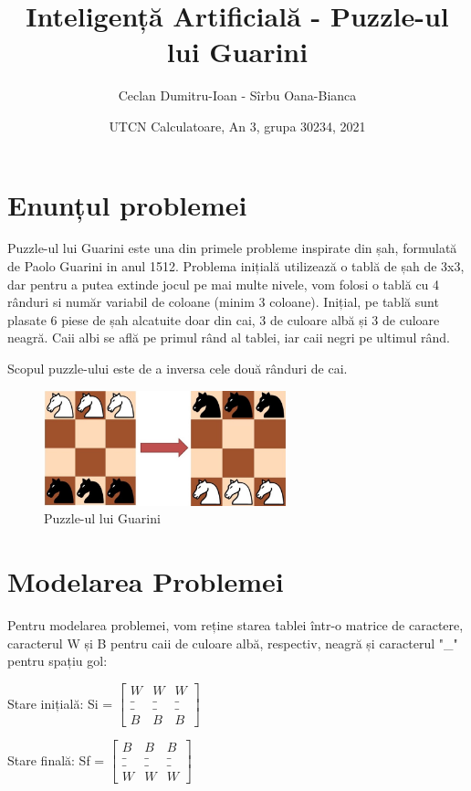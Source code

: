 \documentclass{article}
\title{Inteligență Artificială - Puzzle-ul lui Guarini}
\author{Ceclan Dumitru-Ioan - Sîrbu Oana-Bianca}
\date{UTCN Calculatoare, An 3, grupa 30234, 2021}
\begin{document}
\maketitle

\section{Enunțul problemei}
   
    Puzzle-ul lui Guarini este una din primele probleme inspirate din șah, formulată de Paolo Guarini in anul 1512. Problema inițială utilizează o tablă de șah de 3x3, dar pentru a putea extinde jocul pe mai multe nivele, vom folosi o tablă cu 4 rânduri si număr variabil de coloane (minim 3 coloane). 
    Inițial, pe tablă sunt plasate 6 piese de șah alcatuite doar din cai, 3 de culoare albă și 3 de culoare neagră. Caii albi se află pe primul rând al tablei, iar caii negri pe ultimul rând. 
    
    Scopul puzzle-ului este de a inversa cele două rânduri de cai.
    \begin{figure}[h!]
    \centering
    \includegraphics[width=70mm]{guarini}
    \caption{Puzzle-ul lui Guarini}
    \label{fig:method}
    \end{figure}
    
\section{Modelarea Problemei}
    Pentru modelarea problemei, vom reține starea tablei într-o matrice de caractere, caracterul W și B pentru caii de culoare albă, respectiv, neagră și caracterul "\_" pentru spațiu gol:
    
    Stare inițială: Si = 
    $\begin{bmatrix} 
    W & W & W\\
    \_ & \_ & \_\\
    \_ & \_ & \_\\
    B & B & B
    \end{bmatrix}$
    
    Stare finală: Sf = 
    $\begin{bmatrix} 
    B & B & B\\
    \_ & \_ & \_\\
    \_ & \_ & \_\\
    W & W & W
    \end{bmatrix}$
    
\end{document}
